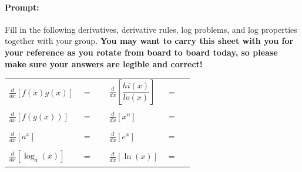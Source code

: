 \documentclass[10pt]{article}
\begin{document}
\pagestyle{otherpages}
\thispagestyle{firstpage}

\Large
\paragraph*{Prompt:} Fill in the following derivatives, derivative rules, log problems, and log properties together with your group. {\bf You may want to carry this sheet with you for your reference as you rotate from board to board today, so please make sure your answers are legible and correct!}\\[0.1in]

\begin{tabular}{l c r l c r}
            $\displaystyle\frac{d}{dx}\left[ f(x)g(x) \right]$ & $=$ & \rule[-8pt]{2in}{0.4pt} &
            $\displaystyle\frac{d}{dx}\left[ \dfrac{hi(x)}{lo(x)} \right]$ & $=$ & \rule[-8pt]{2in}{0.4pt}\\[0.3in]
            $\displaystyle\frac{d}{dx}\left[ f(g(x)) \right]$ & $=$ & \rule[-8pt]{2in}{0.4pt} & 
            $\displaystyle\frac{d}{dx}\left[ x^n \right]$ & $=$ & \rule[-8pt]{2in}{0.4pt}\\[0.3in]
            $\displaystyle\frac{d}{dx}\left[ a^x \right]$ & $=$ & \rule[-8pt]{2in}{0.4pt} & 
            $\displaystyle\frac{d}{dx}\left[ e^x \right]$ & $=$ & \rule[-8pt]{2in}{0.4pt}\\[0.3in]
            $\displaystyle\frac{d}{dx}\left[ \log_a(x) \right]$ & $=$ & \rule[-8pt]{2in}{0.4pt} & 
            $\displaystyle\frac{d}{dx}\left[ \ln(x) \right]$ & $=$ & \rule[-8pt]{2in}{0.4pt}\\[0.3in]
\end{tabular}
       

\newpage%

\end{document}
